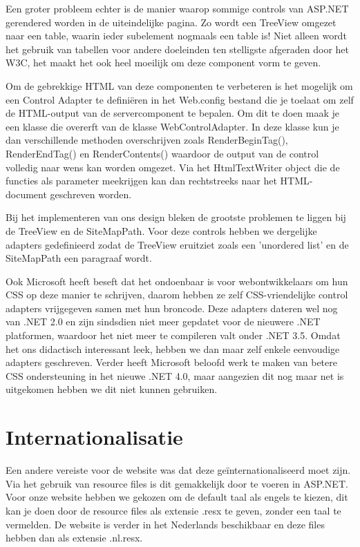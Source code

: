 Een groter probleem echter is de manier waarop sommige controls van ASP.NET gerendered worden in de uiteindelijke pagina. Zo wordt een TreeView omgezet naar een table, waarin ieder subelement nogmaals een table is! Niet alleen wordt het gebruik van tabellen voor andere doeleinden ten stelligste afgeraden door het W3C, het maakt het ook heel moeilijk om deze component vorm te geven.

Om de gebrekkige HTML van deze componenten te verbeteren is het mogelijk om een Control Adapter te defini\"eren in het Web.config bestand die je toelaat om zelf de HTML-output van de servercomponent te bepalen. Om dit te doen maak je een klasse die overerft van de klasse WebControlAdapter. In deze klasse kun je dan verschillende methoden overschrijven zoals RenderBeginTag(), RenderEndTag() en RenderContents() waardoor de output van de control volledig naar wens kan worden omgezet. Via het HtmlTextWriter object die de functies als parameter meekrijgen kan dan rechtstreeks naar het HTML-document geschreven worden.

Bij het implementeren van ons design bleken de grootste problemen te liggen bij de TreeView en de SiteMapPath. Voor deze controls hebben we dergelijke adapters gedefinieerd zodat de TreeView eruitziet zoals een 'unordered list' en de SiteMapPath een paragraaf wordt.

Ook Microsoft heeft beseft dat het ondoenbaar is voor webontwikkelaars om hun CSS op deze manier te schrijven, daarom hebben ze zelf CSS-vriendelijke control adapters vrijgegeven samen met hun broncode. Deze adapters dateren wel nog van .NET 2.0 en zijn sindsdien niet meer gepdatet voor de nieuwere .NET platformen, waardoor het niet meer te compileren valt onder .NET 3.5. Omdat het ons didactisch interessant leek, hebben we dan maar zelf enkele eenvoudige adapters geschreven. Verder heeft Microsoft beloofd werk te maken van betere CSS ondersteuning in het nieuwe .NET 4.0, maar aangezien dit nog maar net is uitgekomen hebben we dit niet kunnen gebruiken.

\section{Internationalisatie}

Een andere vereiste voor de website was dat deze ge\"internationaliseerd moet zijn. Via het gebruik van resource files is dit gemakkelijk door te voeren in ASP.NET. Voor onze website hebben we gekozen om de default taal als engels te kiezen, dit kan je doen door de resource files als extensie .resx te geven, zonder een taal te vermelden. De website is verder in het Nederlands beschikbaar en deze files hebben dan als extensie .nl.resx.

